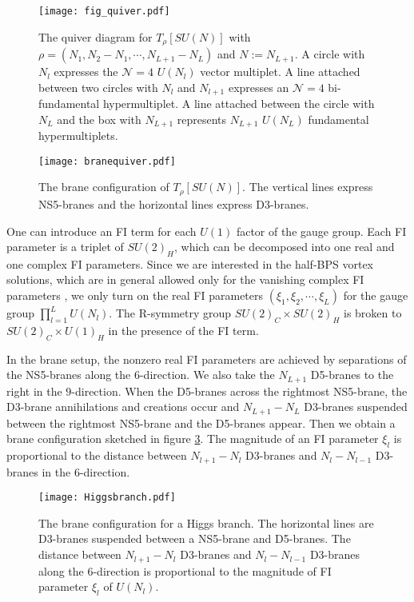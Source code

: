 \documentclass[a4paper,11pt]{article}
\begin{document}
\begin{figure}[tbp]
\begin{center}
\texttt{[image: fig\_quiver.pdf]}
\end{center}
\vspace{-0.5cm}
\caption{The quiver diagram for $T_\rho [SU(N)]$ with $\rho=(N_1,N_2-N_1, \cdots, N_{L+1}-N_{L})$ and $N:=N_{L+1}$. A circle with $N_l$ expresses the $\mathcal{N}=4$ $U(N_l)$ vector multiplet. A line attached between two circles with $N_l$ and $N_{l+1}$ expresses an $\mathcal{N}=4$ bi-fundamental hypermultiplet.
A line attached between the circle with $N_{L}$ and the box with $N_{L+1}$ represents $N_{L+1}$ $U(N_L)$ fundamental hypermultiplets.}
\label{quiver:fig}
\end{figure}

\begin{figure}[tbp]
\begin{center}
\texttt{[image: branequiver.pdf]}
\end{center}
\vspace{-0.5cm}
\caption{The brane configuration of $T_\rho [SU(N)]$. The vertical lines express NS5-branes and the horizontal lines express D3-branes.}
\label{fig:branequiver}
\end{figure}

One can introduce an FI term for each $U(1)$ factor of the gauge group. Each FI parameter is a triplet of $SU(2)_H$, which can be decomposed into one real and one complex FI parameters. Since we are interested in the half-BPS vortex solutions, which are in general allowed only for the vanishing complex FI parameters \cite{Bullimore:2016hdc}, we only turn on the real FI parameters $(\xi_1,\xi_2, \cdots, \xi_L)$ for the gauge group $\prod_{l=1}^L U(N_l)$. The R-symmetry group $SU(2)_C \times SU(2)_H$ is broken to $SU(2)_C \times U(1)_H$ in the presence of the FI term.

In the brane setup, the nonzero real FI parameters are achieved by separations of the NS5-branes along the 6-direction. We also take the $N_{L+1}$ D5-branes to the right in the $9$-direction. When the D5-branes across the rightmost NS5-brane, the D3-brane annihilations and creations occur and $N_{L+1}-N_L$ D3-branes suspended between the rightmost NS5-brane and the D5-branes appear.
Then we obtain a brane configuration sketched in figure \ref{fig:Higgsbranch}. The magnitude of an FI parameter $\xi_l$ is proportional to the distance between $N_{l+1}-N_{l}$ D3-branes and $N_l-N_{l-1}$ D3-branes in the 6-direction.
%
\begin{figure}[tbp]
\begin{center}
\texttt{[image: Higgsbranch.pdf]}
\end{center}
\vspace{-0.5cm}
\caption{The brane configuration for a Higgs branch.
The horizontal lines are D3-branes suspended between a NS5-brane and D5-branes.
The distance between $N_{l+1}-N_l$ D3-branes and $N_{l}-N_{l-1}$ D3-branes along the $6$-direction is proportional to the magnitude of FI parameter $\xi_l$ of $U(N_l)$.}
\label{fig:Higgsbranch}
\end{figure}
%
\end{document}
